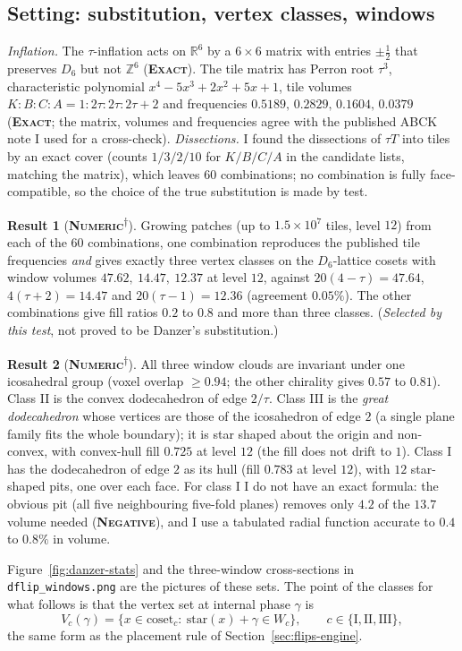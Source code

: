 \documentclass[11pt]{article}
\newcommand{\exact}{\textbf{\textsc{Exact}}}
\newcommand{\numeric}{\textbf{\textsc{Numeric}}}
\newcommand{\negres}{\textbf{\textsc{Negative}}}
\newcommand{\snap}{\textsuperscript{$\dagger$}}      %
\theoremstyle{definition}
\newtheorem{result}{Result}
\begin{document}
\subsection{Setting: substitution, vertex classes, windows}\label{sec:danzer-setting}
\emph{Inflation.} The $\tau$-inflation acts on $\mathbb{R}^6$ by a $6\times6$ matrix with entries $\pm\tfrac12$ that preserves $D_6$ but not $\mathbb{Z}^6$ (\exact). The tile matrix has Perron root $\tau^3$, characteristic polynomial $x^4-5x^3+2x^2+5x+1$, tile volumes $K{:}B{:}C{:}A=1{:}2\tau{:}2\tau{:}2\tau{+}2$ and frequencies $0.5189,\,0.2829,\,0.1604,\,0.0379$ (\exact; the matrix, volumes and frequencies agree with the published ABCK note I used for a cross-check). \emph{Dissections.} I found the dissections of $\tau T$ into tiles by an exact cover (counts $1/3/2/10$ for $K/B/C/A$ in the candidate lists, matching the matrix), which leaves $60$ combinations; no combination is fully face-compatible, so the choice of the true substitution is made by test.
\begin{result}[\numeric\snap]\label{res:danzer-windows}
Growing patches (up to $1.5\times10^7$ tiles, level $12$) from each of the $60$ combinations, one combination reproduces the published tile frequencies \emph{and} gives exactly three vertex classes on the $D_6$-lattice cosets with window volumes $47.62,\ 14.47,\ 12.37$ at level $12$, against $20(4-\tau)=47.64$, $4(\tau+2)=14.47$ and $20(\tau-1)=12.36$ (agreement $0.05\%$). The other combinations give fill ratios $0.2$ to $0.8$ and more than three classes. (\emph{Selected by this test}, not proved to be Danzer's substitution.)
\end{result}
\begin{result}[\numeric\snap]\label{res:danzer-shapes}
All three window clouds are invariant under one icosahedral group (voxel overlap $\ge0.94$; the other chirality gives $0.57$ to $0.81$). Class II is the convex dodecahedron of edge $2/\tau$. Class III is the \emph{great dodecahedron} whose vertices are those of the icosahedron of edge $2$ (a single plane family fits the whole boundary); it is star shaped about the origin and non-convex, with convex-hull fill $0.725$ at level $12$ (the fill does not drift to $1$). Class I has the dodecahedron of edge $2$ as its hull (fill $0.783$ at level $12$), with $12$ star-shaped pits, one over each face. For class I I do not have an exact formula: the obvious pit (all five neighbouring five-fold planes) removes only $4.2$ of the $13.7$ volume needed (\negres), and I use a tabulated radial function accurate to $0.4$ to $0.8\%$ in volume.
\end{result}
Figure~\ref{fig:danzer-stats} and the three-window cross-sections in \texttt{dflip\_windows.png} are the pictures of these sets. The point of the classes for what follows is that the vertex set at internal phase $\gamma$ is
\[ V_c(\gamma)=\{x\in\text{coset}_c:\ \mathrm{star}(x)+\gamma\in W_c\},\qquad c\in\{\mathrm{I},\mathrm{II},\mathrm{III}\}, \]
the same form as the placement rule of Section~\ref{sec:flips-engine}.
\end{document}
